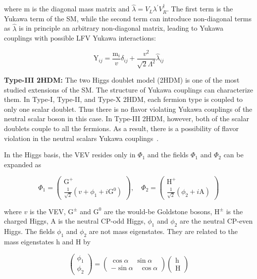where $\text{m}$ is the diagonal mass matrix and $\hat{\lambda}=V_{L} \lambda^{\prime} V_{R}^{\dagger}$. The first term is the Yukawa term of the SM, while the second term can introduce non-diagonal terms as $\hat{\lambda}$ is in principle an arbitrary non-diagonal matrix, leading to Yukawa couplings \Yij with possible LFV Yukawa interactions:

\begin{equation}
  \text{Y}_{i j}=\frac{\text{m}_{i}}{v} \delta_{i j}+\frac{v^2}{\sqrt{2} \Lambda^2} \hat{\lambda}_{i j}
\end{equation}

\textbf{Type-III 2HDM:} The two Higgs doublet model (2HDM) is one of the most studied extensions of the SM. The structure of Yukawa couplings can characterize them. In Type-I, Type-II, and Type-X 2HDM, each fermion type is coupled to only one scalar doublet. Thus there is no flavor violating Yukawa couplings of the neutral scalar boson in this case. In Type-III 2HDM, however, both of the scalar doublets couple to all the fermions. As a result, there is a possibility of flavor violation in the neutral scalars Yukawa couplings~\cite{Primulando:2016eod}.

In the Higgs basis, the VEV resides only in $\Phi_{1}$ and the fields $\Phi_{1}$ and $\Phi_{2}$ can be expanded as

\begin{equation}
  \Phi_{1}=\left(\begin{array}{c} \text{G}^{+} \\ \frac{1}{\sqrt{2}}\left(v+\phi_{1}+i \text{G}^{0}\right) \end{array}\right), \quad
  \Phi_{2}=\left(\begin{array}{c} \text{H}^{+} \\ \frac{1}{\sqrt{2}}\left(\phi_{2}+i \text{A}\right) \end{array}\right)
\end{equation}

where $v$ is the VEV, $\text{G}^{\pm}$ and $\text{G}^0$ are the would-be Goldstone bosons, $\text{H}^{\pm}$ is the charged Higgs, A is the neutral CP-odd Higgs, $\phi_{1}$ and $\phi_{2}$ are the neutral CP-even Higgs. The fields $\phi_{1}$ and $\phi_{2}$ are not mass eigenstates. They are related to the mass eigenstates h and H by

\begin{equation}
  \left(\begin{array}{l} \phi_{1} \\ \phi_{2} \end{array}\right) = \left(\begin{array}{r} \cos \alpha \quad \sin \alpha \\ -\sin \alpha \quad \cos \alpha \end{array}\right)\left(\begin{array}{l} \text{h} \\ \text{H} \end{array}\right)
\end{equation}

